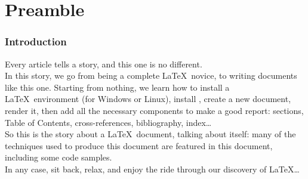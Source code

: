 
\part{Preamble}

\section{Introduction}

Every article tells a story, and this one is no different. \\

In this story, we go from being a complete \LaTeX\ novice, to writing documents like this one. 
Starting from nothing, we learn how to install a \LaTeX\ environment (for Windows or Linux), install \TeXstudio, create a new document, render it, then add all the necessary components to make a good report: sections, Table of Contents, cross-references, bibliography, index\dots \\

So this is the story about a \LaTeX\ document, talking about itself: many of the techniques used to produce this document are featured in this document, including some code samples. \\

In any case, sit back, relax, and enjoy the ride through our discovery of \LaTeX\dots 

